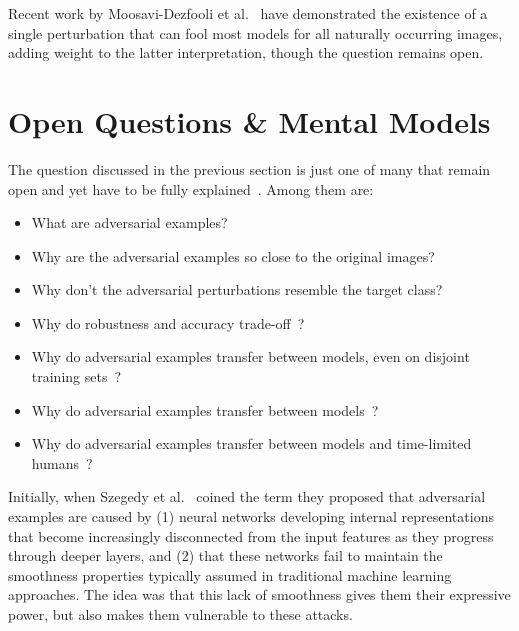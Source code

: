 \documentclass[a4paper, oneside]{discothesis}
\begin{document}
Recent work by Moosavi-Dezfooli et al.\ \cite{moosavi2017universal} have demonstrated the existence of a single perturbation that can fool most models for all naturally occurring images, adding weight to the latter interpretation, though the question remains open.

\section{Open Questions \& Mental Models}

The question discussed in the previous section is just one of many that remain open and yet have to be fully explained~\cite{shamir2021dimpled}. Among them are:

\begin{itemize}
	\setlength\itemsep{0em}
	\item What are adversarial examples?
	\item Why are the adversarial examples so close to the original images?
	\item Why don't the adversarial perturbations resemble the target class?
	\item Why do robustness and accuracy trade-off~\cite{zhang2019theoretically}?
	\item Why do adversarial examples transfer between models, even on disjoint training sets~\cite{szegedy2013intriguing}?
	\item Why do adversarial examples transfer between models~\cite{szegedy2013intriguing}?
	\item Why do adversarial examples transfer between models and time-limited humans~\cite{elsayed2018adversarial}?
\end{itemize}

Initially, when Szegedy et al.\ \cite{szegedy2013intriguing} coined the term they proposed that adversarial examples are caused by (1) neural networks developing internal representations that become increasingly disconnected from the input features as they progress through deeper layers, and (2) that these networks fail to maintain the smoothness properties typically assumed in traditional machine learning approaches. The idea was that this lack of smoothness gives them their expressive power, but also makes them vulnerable to these attacks.
\end{document}
